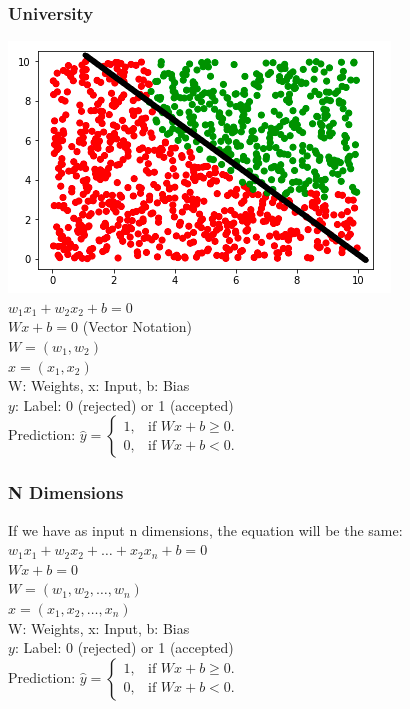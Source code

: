 \begin{frame}[fragile]
  \frametitle{University}
  \includegraphics[scale=0.4]{img/uni_data_2}\\
  \vspace{3mm}
  $w_1x_1+w_2x_2+b=0$\\
  $Wx + b = 0$ (Vector Notation)\\
  $W = (w_1, w_2)$\\
  $x = (x_1, x_2)$\\
  W: Weights, x: Input, b: Bias\\
  $y$: Label: 0 (rejected) or 1 (accepted)\\
  \vspace{3mm}
  Prediction:
  $
  \hat{y}=\begin{cases}
    1, & \text{if $Wx+b \geq 0$}.\\
    0, & \text{if $Wx+b < 0$}.
  \end{cases}
  $  
\end{frame}

\begin{frame}[fragile]
  \frametitle{N Dimensions}
  If we have as input n dimensions, the equation will be the same:\\
  $w_1x_1+w_2x_2+\ldots+x_2x_n+b=0$\\
  $Wx + b = 0$\\
  $W = (w_1, w_2, \ldots, w_n)$\\
  $x = (x_1, x_2, \ldots, x_n)$\\
  W: Weights, x: Input, b: Bias\\
  $y$: Label: 0 (rejected) or 1 (accepted)\\
  \vspace{3mm}
  Prediction:
  $
  \hat{y}=\begin{cases}
    1, & \text{if $Wx+b \geq 0$}.\\
    0, & \text{if $Wx+b < 0$}.
  \end{cases}
  $  
\end{frame}

